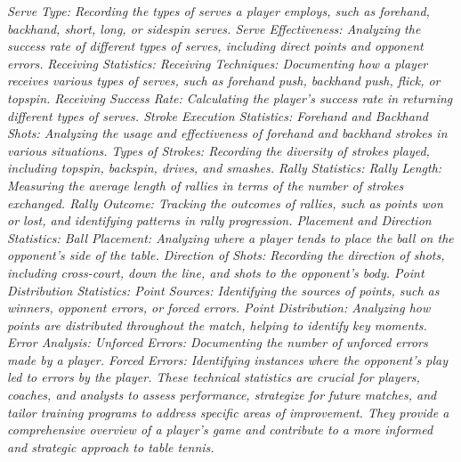 \emph{
    Serve Type: Recording the types of serves a player employs, such as forehand, backhand, short, long, or sidespin serves.
Serve Effectiveness: Analyzing the success rate of different types of serves, including direct points and opponent errors.
}
\emph{Receiving Statistics:
Receiving Techniques: Documenting how a player receives various types of serves, such as forehand push, backhand push, flick, or topspin.
Receiving Success Rate: Calculating the player's success rate in returning different types of serves.
Stroke Execution Statistics:
Forehand and Backhand Shots: Analyzing the usage and effectiveness of forehand and backhand strokes in various situations.
Types of Strokes: Recording the diversity of strokes played, including topspin, backspin, drives, and smashes.
Rally Statistics:
Rally Length: Measuring the average length of rallies in terms of the number of strokes exchanged.
Rally Outcome: Tracking the outcomes of rallies, such as points won or lost, and identifying patterns in rally progression.
Placement and Direction Statistics:
Ball Placement: Analyzing where a player tends to place the ball on the opponent's side of the table.
Direction of Shots: Recording the direction of shots, including cross-court, down the line, and shots to the opponent's body.
Point Distribution Statistics:
Point Sources: Identifying the sources of points, such as winners, opponent errors, or forced errors.
Point Distribution: Analyzing how points are distributed throughout the match, helping to identify key moments.
Error Analysis:
Unforced Errors: Documenting the number of unforced errors made by a player.
Forced Errors: Identifying instances where the opponent's play led to errors by the player.
These technical statistics are crucial for players, coaches, and analysts to assess performance, 
strategize for future matches, and tailor training programs to address specific areas of improvement. 
They provide a comprehensive overview of a player's game and contribute to a more informed and strategic 
approach to table tennis.}